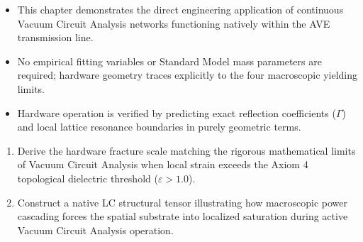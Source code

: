 \begin{summarybox}
\begin{itemize}
    \item This chapter demonstrates the direct engineering application of continuous Vacuum Circuit Analysis networks functioning natively within the AVE transmission line.
    \item No empirical fitting variables or Standard Model mass parameters are required; hardware geometry traces explicitly to the four macroscopic yielding limits.
    \item Hardware operation is verified by predicting exact reflection coefficients ($\Gamma$) and local lattice resonance boundaries in purely geometric terms.
\end{itemize}
\end{summarybox}

\begin{exercisebox}
\begin{enumerate}
    \item Derive the hardware fracture scale matching the rigorous mathematical limits of Vacuum Circuit Analysis when local strain exceeds the Axiom 4 topological dielectric threshold ($\varepsilon > 1.0$).
    \item Construct a native LC structural tensor illustrating how macroscopic power cascading forces the spatial substrate into localized saturation during active Vacuum Circuit Analysis operation.
\end{enumerate}
\end{exercisebox}

